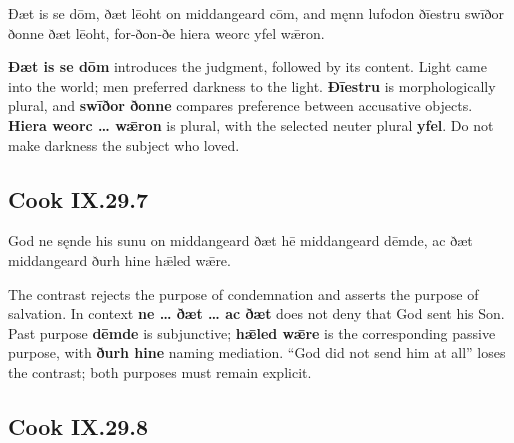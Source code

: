 \par\begin{minipage}{\linewidth}\raggedright
Ðæt is se dōm, ðæt lēoht on middangeard cōm, and męnn lufodon ðīestru swīðor ðonne ðæt lēoht, for-ðon-ðe hiera weorc yfel wǣron.

\textbf{Ðæt is se dōm} introduces the judgment, followed by its content. Light came into the world; men preferred darkness to the light. \textbf{Ðīestru} is morphologically plural, and \textbf{swīðor ðonne} compares preference between accusative objects. \textbf{Hiera weorc … wǣron} is plural, with the selected neuter plural \textbf{yfel}. Do not make darkness the subject who loved.

\end{minipage}\par\addvspace{4pt}

\subsection*{Cook IX.29.7}

\par\begin{minipage}{\linewidth}\raggedright
God ne sęnde his sunu on middangeard ðæt hē middangeard dēmde, ac ðæt middangeard ðurh hine hǣled wǣre.

The contrast rejects the purpose of condemnation and asserts the purpose of salvation. In context \textbf{ne … ðæt … ac ðæt} does not deny that God sent his Son. Past purpose \textbf{dēmde} is subjunctive; \textbf{hǣled wǣre} is the corresponding passive purpose, with \textbf{ðurh hine} naming mediation. “God did not send him at all” loses the contrast; both purposes must remain explicit.

\end{minipage}\par\addvspace{4pt}

\subsection*{Cook IX.29.8}

